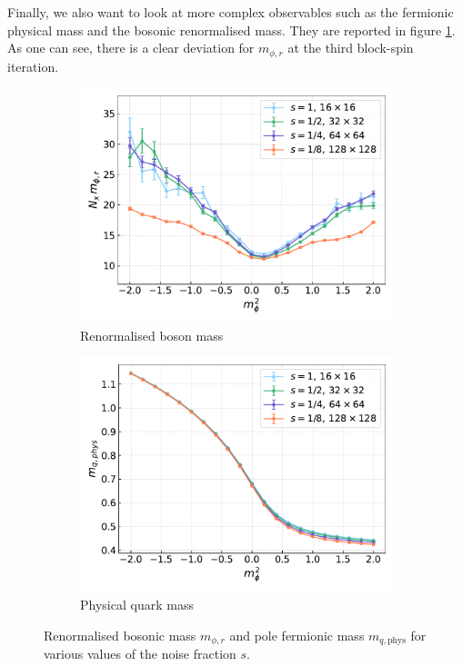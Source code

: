 \newpage
Finally, we also want to look at more complex observables such as the fermionic physical mass and the bosonic renormalised mass. They are reported in figure \ref{fig:cooling_masses}. As one can see, there is a clear deviation for $m_{\phi, r}$ at the third block-spin iteration.
\begin{figure}[h!]
    \begin{subfigure}{0.45\textwidth}
        \includegraphics[scale=0.45]{figures/cooling/mass_scan/mphir.pdf}
        \caption{Renormalised boson mass}
    \end{subfigure}
    \hfill 
    \begin{subfigure}{0.45\textwidth}
        \includegraphics[scale=0.45]{figures/cooling/mass_scan/mqphys.pdf}
        \caption{Physical quark mass}
    \end{subfigure}
    \caption[Masses in the cooling procedure]{Renormalised bosonic mass $m_{\phi, r}$ and pole fermionic mass $m_{q,\text{phys}}$ for various values of the noise fraction $s$.}
    \label{fig:cooling_masses}
\end{figure} 

